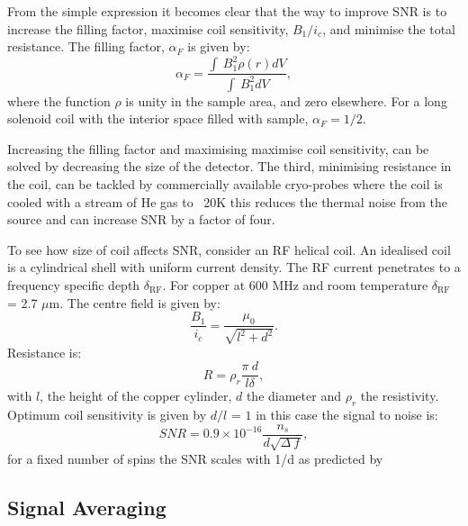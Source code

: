 From the simple expression it becomes clear that the way to improve SNR is to increase the filling factor, maximise coil sensitivity,
$B_1/i_c$, and minimise the total resistance. The filling factor, $\alpha_F$ is given by:
\begin{equation}\label{eqn:FillingFactor}
  \alpha_F = \frac{\int~B_1^2\rho(r)dV}{\int~B_1^2dV},
\end{equation}
where the function $\rho$ is unity in the sample area, and zero elsewhere. For a long solenoid coil with the
interior space filled with sample, $\alpha_F = 1/2$.

Increasing the filling factor and maximising maximise coil sensitivity, can be solved by decreasing the size of
the detector. The third, minimising resistance in the coil,
can be tackled by commercially available cryo-probes where the coil is cooled with a stream of He gas to
~20K this reduces the thermal noise from the source and can increase SNR by a factor of four.

To see how size of coil affects SNR, consider an RF helical coil. An idealised coil
is a cylindrical shell with uniform current density. The RF current penetrates to a frequency
specific depth $\delta_{\text{RF}}$. For copper at 600 MHz and room temperature $\delta_{\text{RF}}$ = 2.7 $\mu$m. The centre
field is given by:
\begin{equation}
  \frac{B_1}{i_c} = \frac{\mu_0}{\sqrt{l^2+d^2}}.
\end{equation}
Resistance is:
\begin{equation}
  R = \rho_r\frac{\pi~d}{l\delta},
\end{equation}
with $l$, the height of the copper cylinder, $d$ the diameter and $\rho_r$ the resistivity.
Optimum coil sensitivity is given by $d/l$ = $1$ in this case the signal to noise is:
\begin{equation}\label{eqn:1/d}
  SNR = 0.9\times10^{-16}\frac{n_s}{d\sqrt{\Delta~f}},
\end{equation}
for a fixed number of spins the SNR scales with 1/d as predicted by \citep{Hoult:1976dw}

\subsection{Signal Averaging}\label{Signal Averaging}

